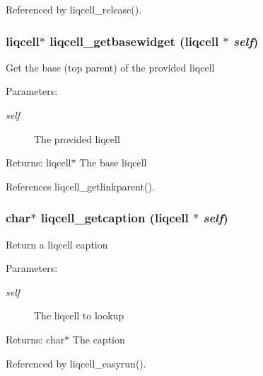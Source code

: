 Referenced by liqcell\_\-release().
\subsubsection[{liqcell\_\-getbasewidget}]{\setlength{\rightskip}{0pt plus 5cm}liqcell$\ast$ liqcell\_\-getbasewidget (liqcell $\ast$ {\em self})}\label{d5/da2/liqcell_8c_4d674ab61e94d1a6612d7d2d7cf88e59}


Get the base (top parent) of the provided liqcell \begin{Desc}
\item[Parameters:]
\begin{description}
\item[{\em self}]The provided liqcell \end{description}
\end{Desc}
\begin{Desc}
\item[Returns:]liqcell$\ast$ The base liqcell \end{Desc}


References liqcell\_\-getlinkparent().
\subsubsection[{liqcell\_\-getcaption}]{\setlength{\rightskip}{0pt plus 5cm}char$\ast$ liqcell\_\-getcaption (liqcell $\ast$ {\em self})}\label{d5/da2/liqcell_8c_d82b7f7697ade9890f4e6e7851503384}


Return a liqcell caption \begin{Desc}
\item[Parameters:]
\begin{description}
\item[{\em self}]The liqcell to lookup \end{description}
\end{Desc}
\begin{Desc}
\item[Returns:]char$\ast$ The caption \end{Desc}


Referenced by liqcell\_\-easyrun().
